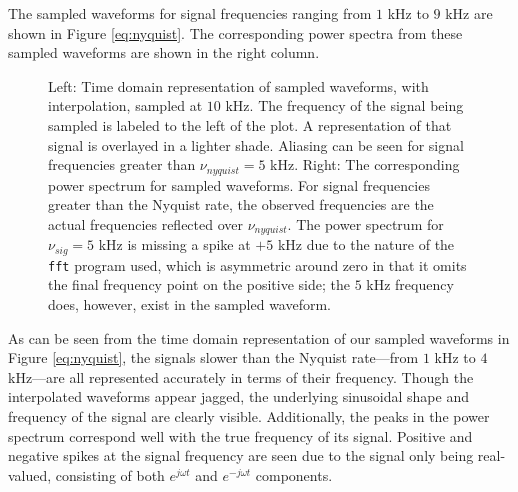 \documentclass[12pt]{article}
\begin{document}
The sampled waveforms for signal frequencies ranging from $1$ kHz to $9$ kHz are shown in Figure \ref{eq:nyquist}. The corresponding power spectra from these sampled waveforms are shown in the right column.

\begin{figure}[H]
\caption[SODUMB]{Left: Time domain representation of sampled waveforms, with interpolation, sampled at $10$ kHz. The frequency of the signal being sampled is labeled to the left of the plot. A representation of that signal is overlayed in a lighter shade. Aliasing can be seen for signal frequencies greater than $\nu_{nyquist}=5$ kHz. Right: The corresponding power spectrum for sampled waveforms. For signal frequencies greater than the Nyquist rate, the observed frequencies are the actual frequencies reflected over $\nu_{nyquist}$. The power spectrum for $\nu_{sig}=5$ kHz is missing a spike at $+5$ kHz due to the nature of the \texttt{fft} program used, which is asymmetric around zero in that it omits the final frequency point on the positive side; the $5$ kHz frequency does, however, exist in the sampled waveform.}
\label{fig:nyquist}
\end{figure}

As can be seen from the time domain representation of our sampled waveforms in Figure \ref{eq:nyquist}, the signals slower than the Nyquist rate---from $1$ kHz to $4$ kHz---are all represented accurately in terms of their frequency. Though the interpolated waveforms appear jagged, the underlying sinusoidal shape and frequency of the signal are clearly visible. Additionally, the peaks in the power spectrum correspond well with the true frequency of its signal. Positive and negative spikes at the signal frequency are seen due to the signal only being real-valued, consisting of both $e^{j\omega t}$ and $e^{-j\omega t}$ components.
\end{document}
